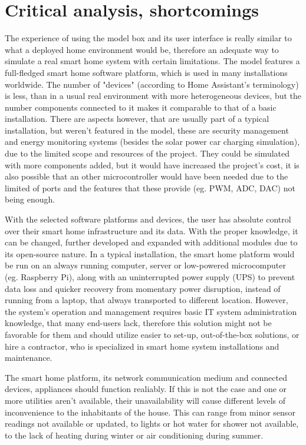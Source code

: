 \section{Critical analysis, shortcomings}

The experience of using the model box and its user interface is really similar to what a deployed home environment would be, therefore an adequate way to simulate a real smart home system with certain limitations. The model features a full-fledged smart home software platform, which is used in many installations worldwide. %
The number of "devices" (according to Home Assistant's terminology) is less, than in a usual real environment with more heterogeneous devices, but the number components connected to it makes it comparable to that of a basic installation.
There are aspects however, that are usually part of a typical installation, but weren't featured in the model, these are security management and energy monitoring systems (besides the solar power car charging simulation), due to the limited scope and resources of the project. They could be simulated with more components added, but it would have increased the project's cost, it is also possible that an other microcontroller would have been needed due to the limited of ports and the features that these provide (eg. PWM, ADC, DAC) not being enough.

With the selected software platforms and devices, the user has absolute control over their smart home infrastructure and its data. With the proper knowledge, it can be changed, further developed and expanded with additional modules due to its open-source nature. In a typical installation, the smart home platform would be run on an always running computer, server or low-powered microcomputer (eg. Raspberry Pi), along with an uninterrupted power supply (UPS) to prevent data loss and quicker recovery from momentary power disruption, instead of running from a laptop, that always transported to different location. However, the system's operation and management requires basic IT system administration knowledge, that many end-users lack, therefore this solution might not be favorable for them and should utilize easier to set-up, out-of-the-box solutions, or hire a contractor, who is specialized in smart home system installations and maintenance.

The smart home platform, its network communication medium and connected devices, appliances should function realiably. If this is not the case and one or more utilities aren't available, their unavailability will cause different levels of inconvenience to the inhabitants of the house. This can range from minor sensor readings not available or updated, to lights or hot water for shower not available, to the lack of heating during winter or air conditioning during summer.

